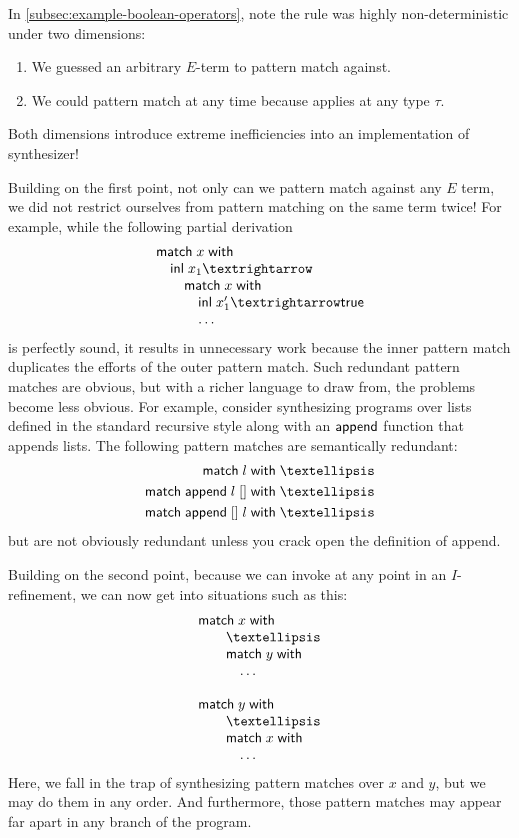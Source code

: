 In \autoref{subsec:example-boolean-operators}, note the  rule was highly non-deterministic under two dimensions:
\begin{enumerate}
  \item We guessed an arbitrary $E$-term to pattern match against.
  \item We could pattern match at any time because  applies at any type $τ$.
\end{enumerate}
Both dimensions introduce extreme inefficiencies into an implementation of synthesizer!

Building on the first point, not only can we pattern match against any $E$ term, we did not restrict ourselves from pattern matching on the same term twice!  For example, while the following partial derivation
\[
  \begin{array}{l}
    \mmatch\;x\;\mwith \\
    \quad \minl{x_1} →                 \\
    \qquad \mmatch\;x\;\mwith          \\
    \qquad\quad \minl{x'_1} → \mtrue   \\
    \qquad\quad \ldots
  \end{array}
\]
is perfectly sound, it results in unnecessary work because the inner pattern match duplicates the efforts of the outer pattern match.
Such redundant pattern matches are obvious, but with a richer language to draw from, the problems become less obvious.
For example, consider synthesizing programs over lists defined in the standard recursive style along with an $\mathsf{append}$ function that appends lists.
The following pattern matches are semantically redundant:
\begin{align*}
  \mmatch\;l\;\mwith\;… \\
  \mmatch\;\mkwd{append}\;l\;[]\;\mwith\;… \\
  \mmatch\;\mkwd{append}\;[]\;l\;\mwith\;…
\end{align*}
but are not obviously redundant unless you crack open the definition of append.

Building on the second point, because we can invoke  at any point in an $I$-refinement, we can now get into situations such as this:
\[
  \begin{array}{l}
    \mmatch\;x\;\mwith \\
    \qquad …                          \\
    \qquad \mmatch\;y\;\mwith         \\
    \qquad\quad \ldots \\
    \\
    \mmatch\;y\;\mwith \\
    \qquad …                          \\
    \qquad \mmatch\;x\;\mwith         \\
    \qquad\quad \ldots
  \end{array}
\]
Here, we fall in the trap of synthesizing pattern matches over $x$ and $y$, but we may do them in any order.
And furthermore, those pattern matches may appear far apart in any branch of the program.

